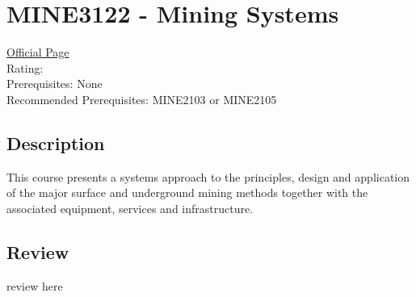 \hypertarget{MINE3122}{\section{MINE3122 - Mining Systems}}

\large
\textcolor{turbo_purple}{\href{https://my.uq.edu.au/programs-courses/course.html?course_code=MINE3122}{Official Page}} \\
Rating: \cstar\cstar\cstar\cstar\ostar \\
Prerequisites: None \\
Recommended Prerequisites: MINE2103 or MINE2105

\normalsize
\subsection*{Description}
This course presents a systems approach to the principles, design and application of the major surface and underground mining methods together with the associated equipment, services and infrastructure.

\subsection*{Review}
review here
